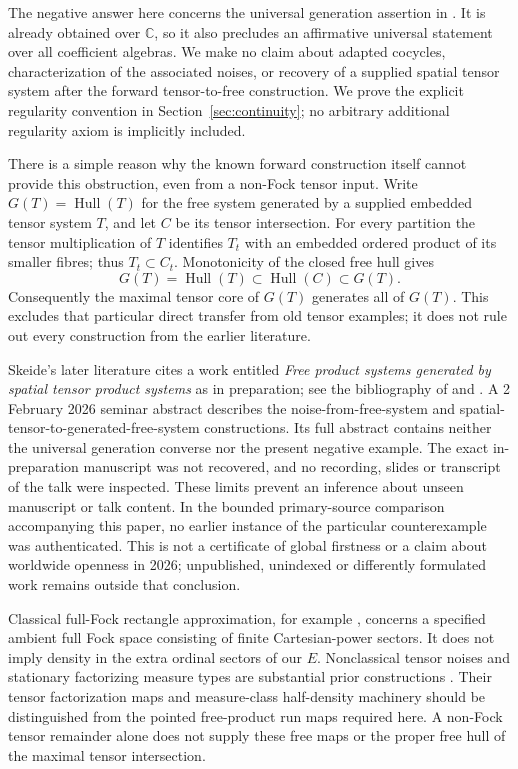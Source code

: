 \documentclass[11pt]{article}
\theoremstyle{remark}\newtheorem{remark}[theorem]{Remark}
\newcommand{\C}{\mathbb C}\newcommand{\F}{\mathcal F}
\begin{document}
The negative answer here concerns the universal generation assertion in
\cite[p.~530]{Skeide2009}. It is already obtained over $\C$, so it also
precludes an affirmative universal statement over all coefficient algebras.
We make no claim about adapted cocycles, characterization of the associated
noises, or recovery of a supplied spatial tensor system after the forward
tensor-to-free construction. We prove the explicit regularity convention in
Section~\ref{sec:continuity}; no arbitrary additional regularity axiom is
implicitly included.

There is a simple reason why the known forward construction itself cannot
provide this obstruction, even from a non-Fock tensor input. Write
$G(T)=\operatorname{Hull}(T)$ for the free system generated by a supplied
embedded tensor system $T$, and let $C$ be its tensor intersection. For every
partition the tensor multiplication of $T$ identifies $T_t$ with an embedded
ordered product of its smaller fibres; thus $T_t\subset C_t$. Monotonicity
of the closed free hull gives
\[
 G(T)=\operatorname{Hull}(T)\subset
 \operatorname{Hull}(C)\subset G(T).
\]
Consequently the maximal tensor core of $G(T)$ generates all of $G(T)$.
This excludes that particular direct transfer from old tensor examples; it
does not rule out every construction from the earlier literature.

Skeide's later literature cites a work entitled \emph{Free product systems
generated by spatial tensor product systems} as in preparation; see the
bibliography of \cite{SkeideClassification} and
\cite[Section~4 and reference~30]{Skeide2022}. A 2 February 2026 seminar
abstract \cite{Skeide2026} describes the noise-from-free-system and
spatial-tensor-to-generated-free-system constructions. Its full abstract
contains neither the universal generation converse nor the present negative
example. The exact in-preparation manuscript was not recovered, and no
recording, slides or transcript of the talk were inspected. These limits
prevent an inference about unseen manuscript or talk content. In the bounded
primary-source comparison accompanying this paper, no earlier instance of
the particular counterexample was authenticated. This is not a certificate
of global firstness or a claim about worldwide openness in 2026; unpublished,
unindexed or differently formulated work remains outside that conclusion.

Classical full-Fock rectangle approximation, for example
\cite[Section~3 and Theorem~1\textup{(1)}]{AttalNechita2008}, concerns a
specified ambient full Fock space consisting of finite Cartesian-power
sectors. It does not imply density in the extra ordinal sectors of our $E$.
Nonclassical tensor noises and stationary factorizing measure types are
substantial prior constructions \cite{Tsirelson2004,Liebscher2003}.
Their tensor factorization maps and measure-class half-density machinery
should be distinguished from the pointed free-product run maps required
here. A non-Fock tensor remainder alone does not supply these free maps or
the proper free hull of the maximal tensor intersection.
\end{document}
